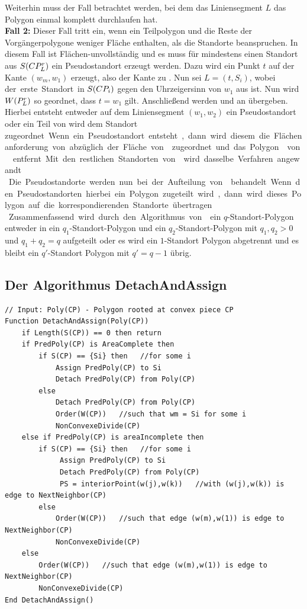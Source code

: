 \documentclass[ngerman]{seminarbeitrag}
\begin{document}
Weiterhin muss der Fall betrachtet werden, bei dem das Liniensegment $L$ das Polygon einmal komplett durchlaufen hat.\\
\textbf{Fall 2:} Dieser Fall tritt ein, wenn ein Teilpolygon und die Reste der Vorgängerpolygone weniger Fläche enthalten, als die Standorte beanspruchen. In diesem Fall ist \cpi Flächen-unvollständig und es muss für mindestens einen Standort aus $S(CP_{L}^{r})$ ein Pseudostandort erzeugt werden. Dazu wird ein Punkt $t$ auf der Kante $(w_{m}, w_{1})$ erzeugt, also der Kante zu \next{\mcpi}. Nun sei $L = (t, S_{i})$, wobei \si der erste Standort in $S(CP_{i})$ gegen den Uhrzeigersinn von $w_{1}$ aus ist. Nun wird $W(P_{L}^{r})$ so geordnet, dass $t = w_{1}$ gilt. Anschließend werden \prl und \pll an \daa übergeben. Hierbei entsteht entweder auf dem Liniensegment $(w_{1}, w_{2})$ ein Pseudostandort oder ein Teil von \prl wird dem Standort \si zugeordnet. Wenn ein Pseudostandort entsteht, dann wird diesem die Flächenanforderung von \si abzüglich der Fläche von \prl zugeordnet und das Polygon \prl von \cpi entfernt. Mit den restlichen Standorten von \cpi wird dasselbe Verfahren angewandt.\\
Die Pseudostandorte werden nun bei der Aufteilung von \next{\mcpi}behandelt. Wenn den Pseudostandorten hierbei ein Polygon zugeteilt wird, dann wird dieses Polygon auf die korrespondierenden Standorte übertragen.\\
Zusammenfassend wird durch den Algorithmus von \noncon ein $q$-Standort-Polygon entweder in ein $q_{1}$-Standort-Polygon und ein $q_{2}$-Standort-Polygon mit $q_{1}, q_{2} > 0$ und $q_{1} + q_{2} = q$ aufgeteilt oder es wird ein $1$-Standort Polygon abgetrennt und es bleibt ein $q'$-Standort Polygon mit $q' = q - 1$ übrig.

\subsection{Der Algorithmus DetachAndAssign}\label{detach}

\begin{lstlisting}[float,caption={Der Algorithmus \daa}, frame=single, label=code detach]
// Input: Poly(CP) - Polygon rooted at convex piece CP
Function DetachAndAssign(Poly(CP))
    if Length(S(CP)) == 0 then return 
    if PredPoly(CP) is AreaComplete then
        if S(CP) == {Si} then   //for some i
            Assign PredPoly(CP) to Si
            Detach PredPoly(CP) from Poly(CP)
        else
            Detach PredPoly(CP) from Poly(CP)
            Order(W(CP))   //such that wm = Si for some i
            NonConvexeDivide(CP)
    else if PredPoly(CP) is areaIncomplete then
        if S(CP) == {Si} then	//for some i
             Assign PredPoly(CP) to Si
             Detach PredPoly(CP) from Poly(CP)
             PS = interiorPoint(w(j),w(k))   //with (w(j),w(k)) is edge to NextNeighbor(CP)
        else
            Order(W(CP))   //such that edge (w(m),w(1)) is edge to NextNeighbor(CP)
            NonConvexeDivide(CP)
    else
        Order(W(CP))   //such that edge (w(m),w(1)) is edge to NextNeighbor(CP)
        NonConvexeDivide(CP)
End DetachAndAssign()

\end{lstlisting}
\end{document}
